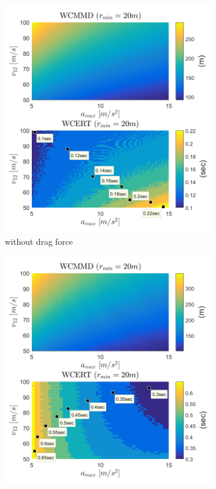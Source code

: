 \documentclass[journal,11pt,onecolumn,draftclsnofoot,]{IEEEtran}
\begin{document}
\begin{figure}
    \centering
    \begin{subfigure}[b]{.45\columnwidth}
        \centering
        \includegraphics[width=\columnwidth]{100x100_no_drag}
        \caption{without drag force}
        \label{fig:avoidance_no_drag}
    \end{subfigure}%
	\hfill
    \begin{subfigure}[b]{.45\columnwidth}
        \centering
        \includegraphics[width=\columnwidth]{50x50_drag}

\end{subfigure}
\end{figure}
\end{document}
